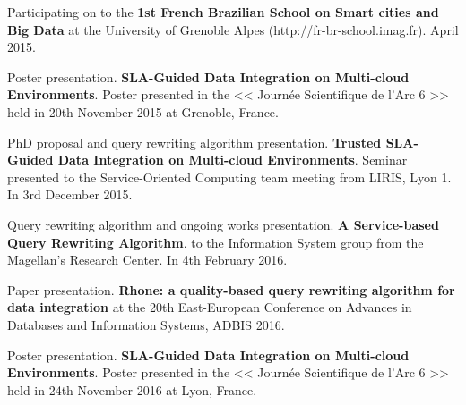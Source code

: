\bigskip
\noindent
Participating on to the \textbf{1st French Brazilian School on Smart cities and Big Data} at the
University of Grenoble Alpes (http://fr-br-school.imag.fr). April 2015.

\bigskip
\noindent
Poster presentation. \textbf{SLA-Guided Data Integration on Multi-cloud Environments}. Poster presented in the << Journ\'ee Scientifique de l'Arc 6 >> held in 20th November 2015 at Grenoble, France. 

\bigskip
\noindent
PhD proposal and query rewriting algorithm presentation. \textbf{Trusted SLA-Guided Data Integration on Multi-cloud Environments}. Seminar presented to the Service-Oriented Computing team meeting from LIRIS, Lyon 1. In 3rd December 2015.

\bigskip
\noindent
Query rewriting algorithm and ongoing works presentation. \textbf{A Service-based Query Rewriting Algorithm}. to the Information System group from the Magellan's Research Center. In 4th February 2016.

\bigskip
\noindent
Paper presentation. \textbf{Rhone: a quality-based query rewriting algorithm for data integration} at the 20th East-European Conference on Advances in Databases and Information Systems, ADBIS 2016.

\bigskip
\noindent
Poster presentation. \textbf{SLA-Guided Data Integration on Multi-cloud Environments}. Poster presented in the << Journ\'ee Scientifique de l'Arc 6 >> held in 24th November 2016 at Lyon, France. 